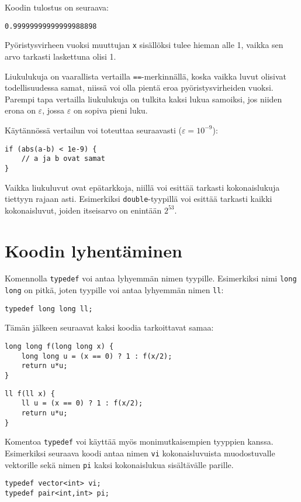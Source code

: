 Koodin tulostus on seuraava:

\begin{lstlisting}
0.99999999999999988898
\end{lstlisting}

Pyöristysvirheen vuoksi muuttujan \texttt{x}
sisällöksi tulee hieman alle 1,
vaikka sen arvo tarkasti laskettuna olisi 1.

Liukulukuja on vaarallista vertailla \texttt{==}-merkinnällä,
koska vaikka luvut olisivat todellisuudessa samat,
niissä voi olla pientä eroa pyöristysvirheiden vuoksi.
Parempi tapa vertailla liukulukuja on
tulkita kaksi lukua samoiksi, jos niiden erona on $\varepsilon$,
jossa $\varepsilon$ on sopiva pieni luku.

Käytännössä vertailun voi toteuttaa seuraavasti ($\varepsilon=10^{-9}$):

\begin{lstlisting}
if (abs(a-b) < 1e-9) {
    // a ja b ovat samat
}
\end{lstlisting}

Vaikka liukuluvut ovat epätarkkoja, niillä voi esittää
tarkasti kokonaislukuja tiettyyn rajaan asti.
Esimerkiksi \texttt{double}-tyypillä voi esittää
tarkasti kaikki kokonaisluvut, joiden itseisarvo
on enintään $2^{53}$.

\section{Koodin lyhentäminen}


Komennolla \texttt{typedef} voi antaa lyhyemmän
nimen tyypille.
Esimerkiksi nimi \texttt{long long} on pitkä,
joten tyypille voi antaa lyhyemmän nimen \texttt{ll}:
\begin{lstlisting}
typedef long long ll;
\end{lstlisting}
Tämän jälkeen seuraavat kaksi koodia tarkoittavat samaa:
\begin{lstlisting}
long long f(long long x) {
    long long u = (x == 0) ? 1 : f(x/2);
    return u*u;
}
\end{lstlisting}
\begin{lstlisting}
ll f(ll x) {
    ll u = (x == 0) ? 1 : f(x/2);
    return u*u;
}
\end{lstlisting}
Komentoa \texttt{typedef} voi käyttää myös
monimutkaisempien tyyppien kanssa.
Esimerkiksi seuraava koodi antaa nimen \texttt{vi}
kokonaisluvuista muodostuvalle vektorille
sekä nimen \texttt{pi} kaksi
kokonaislukua sisältävälle parille.
\begin{lstlisting}
typedef vector<int> vi;
typedef pair<int,int> pi;
\end{lstlisting}

